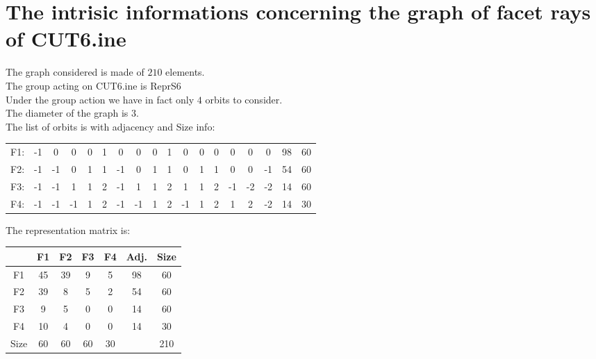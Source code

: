 \documentclass[12pt]{article}
\begin{document}
\section{The intrisic informations concerning the graph of facet rays of CUT6.ine}
The graph considered is made of $210$ elements.\\
The group acting on CUT6.ine is ReprS6\\
Under the group action we have in fact only $4$ orbits to consider.\\
The diameter of the graph is $3$.\\
The list of orbits is with adjacency and Size info:
\begin{center}
\scriptsize
\begin{tabular}{cccccccccccccccc|c|c}
F1:&-1&0&0&0&1&0&0&0&1&0&0&0&0&0&0&98&60\\
F2:&-1&-1&0&1&1&-1&0&1&1&0&1&1&0&0&-1&54&60\\
F3:&-1&-1&1&1&2&-1&1&1&2&1&1&2&-1&-2&-2&14&60\\
F4:&-1&-1&-1&1&2&-1&-1&1&2&-1&1&2&1&2&-2&14&30\\
\end{tabular}
\end{center}
The representation matrix is:
\begin{center}
\scriptsize
\begin{tabular}{|c|cccc|c|c|}
\hline
&F1&F2&F3&F4&Adj.&Size\\
\hline
F1& 45& 39& 9& 5&98&60\\
F2& 39& 8& 5& 2&54&60\\
F3& 9& 5& 0& 0&14&60\\
F4& 10& 4& 0& 0&14&30\\
\hline
Size&60&60&60&30&&210\\
\hline
\end{tabular}
\end{center}
\end{document}
